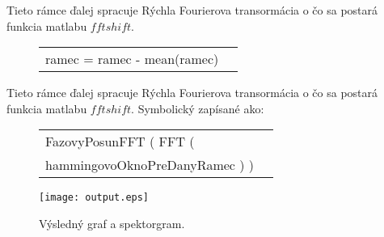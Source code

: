 \documentclass[slovak]{ExcelAtFIT} %
\begin{document}
    Tieto rámce ďalej spracuje Rýchla Fourierova transormácia o čo sa postará funkcia matlabu $fftshift$.


\begin{figure}[ht]
\centering
\begin{tabular}{ll}
        ramec = ramec - mean(ramec)
\end{tabular}
\end{figure}

    Tieto rámce ďalej spracuje Rýchla Fourierova transormácia o čo sa postará funkcia matlabu $fftshift$. Symbolický zapísané ako:\newline

\begin{figure}[ht]
\centering
\begin{tabular}{ll}
FazovyPosunFFT ( FFT (\\
   hammingovoOknoPreDanyRamec ) )
\end{tabular}
\end{figure}





    \begin{figure}\centering
      \centering
        \texttt{[image: output.eps]}  
        \caption{Výsledný graf a spektorgram.}
        \label{fig:output}
    \end{figure}        
\end{document}
